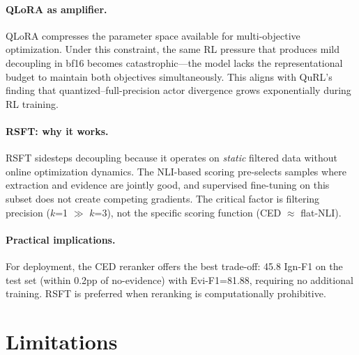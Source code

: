 \documentclass[11pt,a4paper]{article}
\begin{document}
\paragraph{QLoRA as amplifier.} QLoRA compresses the parameter space available for multi-objective optimization. Under this constraint, the same RL pressure that produces mild decoupling in bf16 becomes catastrophic---the model lacks the representational budget to maintain both objectives simultaneously. This aligns with QuRL's finding that quantized--full-precision actor divergence grows exponentially during RL training.

\paragraph{RSFT: why it works.} RSFT sidesteps decoupling because it operates on \emph{static} filtered data without online optimization dynamics. The NLI-based scoring pre-selects samples where extraction and evidence are jointly good, and supervised fine-tuning on this subset does not create competing gradients. The critical factor is filtering precision ($k$=1 $\gg$ $k$=3), not the specific scoring function (CED $\approx$ flat-NLI).

\paragraph{Practical implications.} For deployment, the CED reranker offers the best trade-off: 45.8 Ign-F1 on the test set (within 0.2pp of no-evidence) with Evi-F1=81.88, requiring no additional training. RSFT is preferred when reranking is computationally prohibitive.

\section{Limitations}
\label{sec:limitations}
\end{document}
